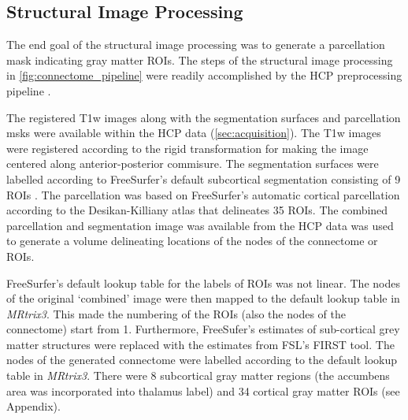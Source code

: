 \documentclass[msthesis.tex]{subfiles}
\begin{document}
\subsection{Structural Image Processing}
\label{subsec:struct_diff}
The end goal of the structural image processing was to generate a parcellation mask indicating gray matter ROIs. The steps of the structural image processing in \cref{fig:connectome_pipeline} were readily accomplished by the \gls{HCP} preprocessing pipeline \citep{GLASSER2013105}.

The registered T1w images along with the segmentation surfaces and parcellation msks were available within the \gls{HCP} data (\autoref{sec:acquisition}). The T1w images were registered according to the rigid transformation for making the image centered along anterior-posterior commisure. The segmentation surfaces were labelled according to FreeSurfer's default subcortical segmentation consisting of 9 \gls{ROI}s
. The parcellation was based on FreeSurfer's automatic cortical parcellation according to the Desikan-Killiany atlas that delineates 35 \gls{ROI}s. The combined parcellation and segmentation image was available from the \gls{HCP} data was used to generate a volume delineating locations of the nodes of the connectome or \gls{ROI}s. 

FreeSurfer's default lookup table for the labels of \gls{ROI}s was not linear. The nodes of the original `combined' image were then mapped to the default lookup table in \textit{MRtrix3}. This made the numbering of the ROIs (also the nodes of the connectome) start from 1. Furthermore, FreeSufer's estimates of sub-cortical grey matter structures were replaced with the estimates from FSL's FIRST tool.
The nodes of the generated connectome were labelled according to the default lookup table in \textit{MRtrix3}. There were 8 subcortical gray matter regions (the accumbens area was incorporated into thalamus label) and 34 cortical gray matter ROIs (see Appendix). 
\end{document}
